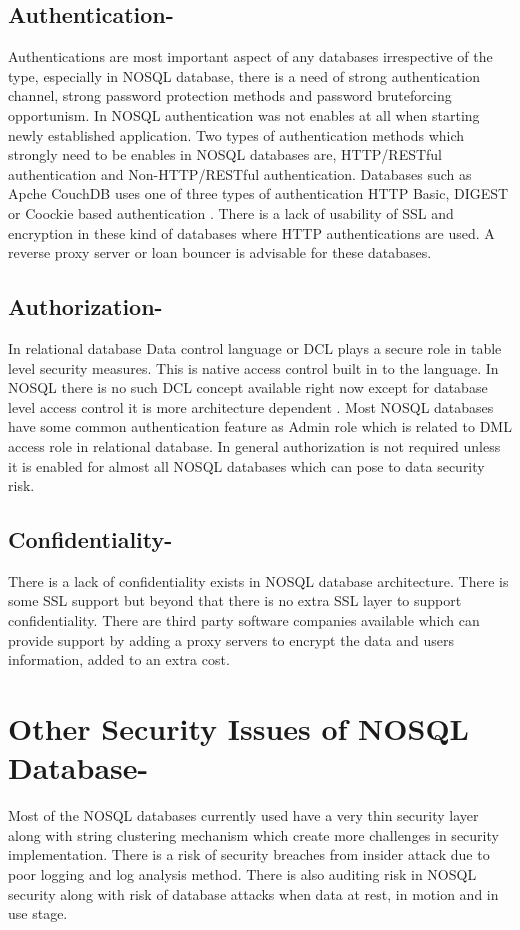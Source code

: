 \subsection{Authentication-} Authentications are most important aspect of any databases irrespective of the type, especially in NOSQL database, there is a need of strong authentication channel, strong password protection methods and password bruteforcing opportunism.  In NOSQL authentication was not enables at all when starting newly established application. Two types of authentication methods which strongly need to be enables in NOSQL databases are, HTTP/RESTful authentication and Non-HTTP/RESTful authentication. Databases such as Apche CouchDB uses one of three types of authentication HTTP Basic, DIGEST or Coockie based authentication \cite{editor03}. There is a lack of usability of SSL and encryption in these kind of databases where HTTP authentications are used. A reverse proxy server or loan bouncer is advisable for these databases. 

\subsection{Authorization-} In relational database Data control language or DCL plays a secure role in table level security measures. This is native access control built in to the language. In NOSQL there is no such DCL concept available right now except for database level access control it is more architecture dependent \cite{editor04}.  Most NOSQL databases have some common authentication feature as Admin role which is related to DML access role in relational database. In general authorization is not required unless it is enabled for almost all NOSQL databases which can pose to data security risk.


\subsection{Confidentiality-} There is a lack of confidentiality exists in NOSQL database architecture. There is some SSL support but beyond that there is no extra SSL layer to support confidentiality\cite{editor03}. There are third party software companies available which can provide support by adding a proxy servers to encrypt the data and users information, added to an extra cost. 

\section{Other Security Issues of NOSQL Database-} Most of the NOSQL databases currently used have a very thin security layer along with string clustering mechanism which create more challenges in security implementation. There is a risk of security breaches from insider attack due to poor logging and log analysis method. There is also auditing risk in NOSQL security along with risk of database attacks when data at rest, in motion and in use stage. 

